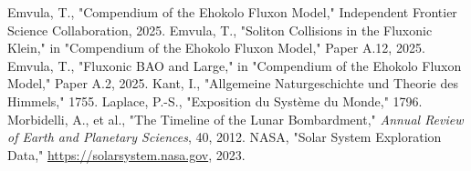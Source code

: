 \documentclass[11pt]{article}
\begin{document}



\begin{thebibliography}{9}
Emvula, T., "Compendium of the Ehokolo Fluxon Model," Independent Frontier Science Collaboration, 2025.
Emvula, T., "Soliton Collisions in the Fluxonic Klein," in "Compendium of the Ehokolo Fluxon Model," Paper A.12, 2025.
Emvula, T., "Fluxonic BAO and Large," in "Compendium of the Ehokolo Fluxon Model," Paper A.2, 2025.
Kant, I., "Allgemeine Naturgeschichte und Theorie des Himmels," 1755.
Laplace, P.-S., "Exposition du Système du Monde," 1796.
Morbidelli, A., et al., "The Timeline of the Lunar Bombardment," \textit{Annual Review of Earth and Planetary Sciences}, 40, 2012.
NASA, "Solar System Exploration Data," \url{https://solarsystem.nasa.gov}, 2023.
\end{thebibliography}
\end{document}
